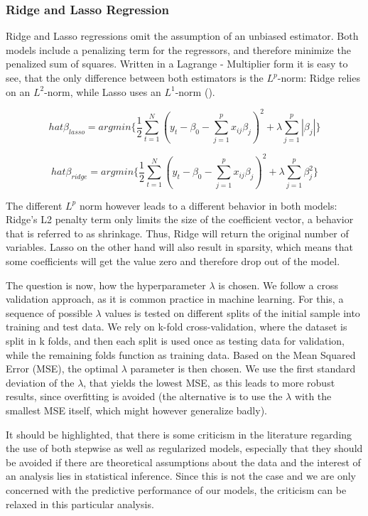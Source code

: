 \subsubsection{Ridge and Lasso Regression}
Ridge and Lasso regressions omit the assumption of an unbiased estimator. Both models include a penalizing term for the regressors, and therefore minimize the penalized sum of squares.  Written in a Lagrange - Multiplier form it is easy to see, that the only difference between both estimators is the $L^{p}$-norm: Ridge relies on an $L^{2}$-norm, while Lasso uses an  $L^{1}$-norm (\cite{friedman_elements_2001}).  

\begin{equation}
hat{\beta_{lasso}}=argmin\{\frac{1}{2}\sum_{t=1}^{N}(y_{t}-\beta_{0}-\sum_{j=1}^{p}x_{ij}\beta_{j})^{2}+\lambda\sum_{j=1}^{p}|\beta_{j}|\}
\end{equation}

\begin{equation}
hat{\beta_{ridge}}=argmin\{\frac{1}{2}\sum_{t=1}^{N}(y_{t}-\beta_{0}-\sum_{j=1}^{p}x_{ij}\beta_{j})^{2}+\lambda\sum_{j=1}^{p}\beta_{j}^{2}\}
\end{equation}

The different $L^{p}$ norm however leads to a different behavior in both models: Ridge's L2 penalty term only limits the size of the coefficient vector, a behavior that is referred to as shrinkage. Thus, Ridge will return the original number of variables.  Lasso on the other hand will also result in sparsity, which means that some coefficients will get the value zero and therefore drop out of the model. 

The question is now, how the hyperparameter $\lambda$ is chosen. We follow a cross validation approach, as it is common practice in machine learning. For this, a sequence of possible $\lambda$ values is tested on different splits  of the initial sample into training and test data.  We rely on  k-fold cross-validation, where the dataset is split in k folds, and then each split is used once as testing data for validation, while the remaining folds function as training data. 
Based on the Mean Squared Error (MSE), the optimal $\lambda$ parameter is then chosen. We use the first standard deviation of the $\lambda$, that yields the lowest MSE, as this leads to more robust results, since overfitting is avoided (the alternative is to use the  $\lambda$ with the smallest MSE itself, which might however generalize badly). 

It should be highlighted, that there is some criticism in the literature regarding the use of both stepwise as well as regularized models, especially that they should be avoided if there are theoretical assumptions about the data and the interest of an analysis lies in statistical inference. Since this is not the case and we are only concerned with the predictive performance of our models, the criticism can be relaxed in this particular analysis. 



